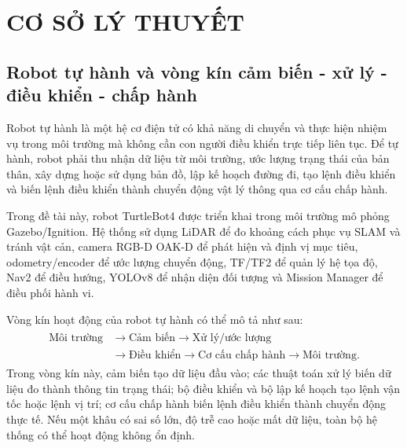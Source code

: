 \providecommand{\placeholderfigure}[3]{%
    \begin{figure}[H]
        \centering
        \fbox{%
            \parbox[c][3.0cm][c]{0.90\textwidth}{%
                \centering\small\itshape #1%
            }%
        }
        \caption{#2}
        \label{#3}
    \end{figure}
}

\section{CƠ SỞ LÝ THUYẾT}\label{sec:theory}

\subsection{Robot tự hành và vòng kín cảm biến - xử lý - điều khiển - chấp hành}\label{subsec:autonomous-loop}

Robot tự hành là một hệ cơ điện tử có khả năng di chuyển và thực hiện
nhiệm vụ trong môi trường mà không cần con người điều khiển trực tiếp
liên tục. Để tự hành, robot phải thu nhận dữ liệu từ môi trường, ước
lượng trạng thái của bản thân, xây dựng hoặc sử dụng bản đồ, lập kế
hoạch đường đi, tạo lệnh điều khiển và biến lệnh điều khiển thành chuyển
động vật lý thông qua cơ cấu chấp hành.

Trong đề tài này, robot TurtleBot4 được triển khai trong môi trường mô
phỏng Gazebo/Ignition. Hệ thống sử dụng LiDAR để đo khoảng cách phục vụ
SLAM và tránh vật cản, camera RGB-D OAK-D để phát hiện và định vị mục
tiêu, odometry/encoder để ước lượng chuyển động, TF/TF2 để quản lý hệ
tọa độ, Nav2 để điều hướng, YOLOv8 để nhận diện đối tượng và Mission
Manager để điều phối hành vi.

Vòng kín hoạt động của robot tự hành có thể mô tả như sau:
\begin{gather*}
\begin{aligned}
\text{Môi trường} &\rightarrow \text{Cảm biến} \rightarrow \text{Xử lý/ước lượng} \\
&\rightarrow \text{Điều khiển} \rightarrow \text{Cơ cấu chấp hành} \rightarrow \text{Môi trường}.
\end{aligned}
\end{gather*}
Trong vòng kín này, cảm biến tạo dữ liệu đầu vào; các thuật toán xử lý
biến dữ liệu đo thành thông tin trạng thái; bộ điều khiển và bộ lập kế
hoạch tạo lệnh vận tốc hoặc lệnh vị trí; cơ cấu chấp hành biến lệnh điều
khiển thành chuyển động thực tế. Nếu một khâu có sai số lớn, độ trễ cao
hoặc mất dữ liệu, toàn bộ hệ thống có thể hoạt động không ổn định.


